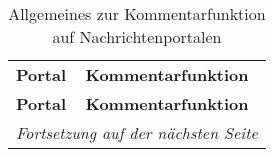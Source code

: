 \begin{landscape} \footnotesize
\begin{longtable}{lp{170mm}}

  \caption{Allgemeines zur Kommentarfunktion auf Nachrichtenportalen} \\ \\
  \toprule
  \bfseries Portal & \bfseries Kommentarfunktion \\\midrule[\heavyrulewidth]
  \endfirsthead

  \toprule
  \bfseries Portal & \bfseries Kommentarfunktion \\\midrule[\heavyrulewidth]
  \endfirsthead

  \bottomrule
  \multicolumn{2}{r}{\emph{Fortsetzung auf der nächsten Seite}}
  \endfoot

  \bottomrule
  \endlastfoot


\end{longtable}
\end{landscape}
